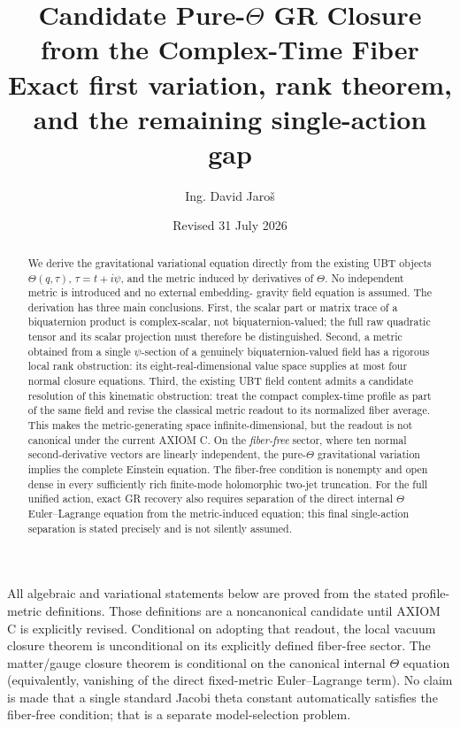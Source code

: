 \documentclass[11pt,a4paper]{article}
\title{Candidate Pure-$\Theta$ GR Closure from the Complex-Time Fiber\\
\large Exact first variation, rank theorem, and the remaining single-action gap}
\author{Ing. David Jaroš}
\date{Revised 31 July 2026}
\theoremstyle{remark}
\begin{document}
\maketitle

\begin{abstract}
We derive the gravitational variational equation directly from the existing UBT
objects $\Theta(q,\tau)$, $\tau=t+i\psi$, and the metric induced by derivatives
of $\Theta$.  No independent metric is introduced and no external embedding-
gravity field equation is assumed.  The derivation has three main conclusions.
First, the scalar part or matrix trace of a biquaternion product is complex-scalar,
not biquaternion-valued; the full raw quadratic tensor and its scalar projection
must therefore be distinguished.  Second, a metric obtained from a single
$\psi$-section of a genuinely biquaternion-valued field has a rigorous local rank
obstruction: its eight-real-dimensional value space supplies at most four normal
closure equations.  Third, the existing UBT field content admits a candidate resolution of this
kinematic obstruction: treat the compact complex-time profile as part of the
same field and revise the classical metric readout to its normalized fiber
average.  This makes the metric-generating space infinite-dimensional, but the
readout is not canonical under the current AXIOM C.  On the
\emph{fiber-free} sector, where ten normal second-derivative vectors are linearly
independent, the pure-$\Theta$ gravitational variation implies the complete
Einstein equation.  The fiber-free condition is nonempty and open dense in every sufficiently rich finite-mode holomorphic two-jet truncation.  For the full unified action, exact GR recovery also
requires separation of the direct internal $\Theta$ Euler--Lagrange equation from
the metric-induced equation; this final single-action separation is stated
precisely and is not silently assumed.
\end{abstract}

\begin{tcolorbox}[colback=blue!4,colframe=blue!65!black,title=Epistemic status]
All algebraic and variational statements below are proved from the stated
profile-metric definitions.  Those definitions are a noncanonical candidate
until AXIOM C is explicitly revised.  Conditional on adopting that readout, the
local vacuum closure theorem is unconditional on its explicitly defined
fiber-free sector.  The matter/gauge closure theorem is conditional on
the canonical internal $\Theta$ equation (equivalently, vanishing of the direct
fixed-metric Euler--Lagrange term).  No claim is made that a single standard
Jacobi theta constant automatically satisfies the fiber-free condition; that is
a separate model-selection problem.
\end{tcolorbox}
\end{document}
